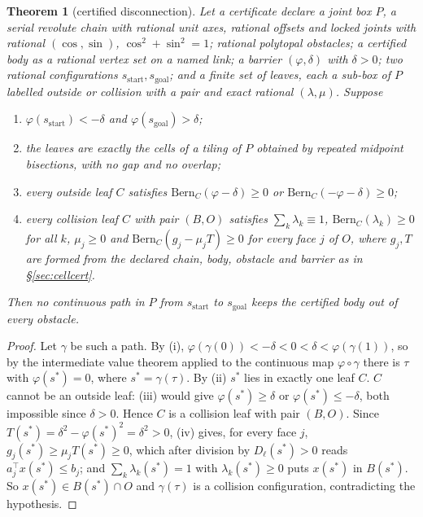 \documentclass[10pt,twocolumn,letterpaper]{article}
\newtheorem{theorem}{Theorem}
\newcommand{\Bern}{\mathrm{Bern}}
\newcommand{\vphi}{\varphi}
\newif\ifhl \hlfalse  %
\newcommand{\new}[1]{\ifhl{\color{blue!65!black}#1}\else#1\fi}
\begin{document}
\begin{theorem}[certified disconnection]\label{thm:main}
Let a certificate declare a joint box $P$, a serial revolute chain with rational unit axes, rational offsets and locked joints with rational $(\cos,\sin)$, $\cos^2+\sin^2=1$; rational polytopal obstacles; \new{a certified body as a rational vertex set on a named link}; a barrier $(\vphi,\delta)$ with $\delta>0$; two rational configurations $s_{\mathrm{start}},s_{\mathrm{goal}}$; and a finite set of leaves, each a sub-box of $P$ labelled \emph{outside} or \emph{collision} with a pair and exact rational $(\lambda,\mu)$. Suppose
\begin{enumerate}[label=(\roman*)]
\item $\vphi(s_{\mathrm{start}})<-\delta$ and $\vphi(s_{\mathrm{goal}})>\delta$;
\item the leaves are exactly the cells of a tiling of $P$ obtained by repeated midpoint bisections, with no gap and no overlap;
\item every outside leaf $C$ satisfies $\Bern_C(\vphi-\delta)\ge0$ or $\Bern_C(-\vphi-\delta)\ge0$;
\item every collision leaf $C$ with pair $(B,O)$ satisfies $\sum_k\lambda_k\equiv1$, $\Bern_C(\lambda_k)\ge0$ for all $k$, $\mu_j\ge0$ and $\Bern_C(g_j-\mu_jT)\ge0$ for every face $j$ of $O$, where $g_j,T$ are formed from the declared chain, body, obstacle and barrier as in \S\ref{sec:cellcert}.
\end{enumerate}
Then no continuous path in $P$ from $s_{\mathrm{start}}$ to $s_{\mathrm{goal}}$ keeps \new{the certified body} out of every obstacle.
\end{theorem}
\begin{proof}
Let $\gamma$ be such a path. By (i), $\vphi(\gamma(0))<-\delta<0<\delta<\vphi(\gamma(1))$, so by the intermediate value theorem applied to the continuous map $\vphi\circ\gamma$ there is $\tau$ with $\vphi(s^*)=0$, where $s^*=\gamma(\tau)$. By (ii) $s^*$ lies in exactly one leaf $C$. $C$ cannot be an outside leaf: (iii) would give $\vphi(s^*)\ge\delta$ or $\vphi(s^*)\le-\delta$, both impossible since $\delta>0$. Hence $C$ is a collision leaf with pair $(B,O)$. Since $T(s^*)=\delta^2-\vphi(s^*)^2=\delta^2>0$, (iv) gives, for every face $j$, $g_j(s^*)\ge\mu_jT(s^*)\ge0$, which after division by $D_\ell(s^*)>0$ reads $a_j^{\top}x(s^*)\le b_j$; and $\sum_k\lambda_k(s^*)=1$ with $\lambda_k(s^*)\ge0$ puts $x(s^*)$ in $B(s^*)$. So $x(s^*)\in B(s^*)\cap O$ and $\gamma(\tau)$ is a collision configuration, contradicting the hypothesis.
\end{proof}
\end{document}
